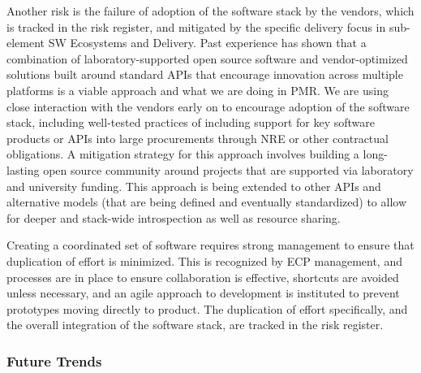Another risk is the failure of adoption of the software stack by the vendors, which is tracked in the risk register, and mitigated by the specific delivery focus in sub-element SW Ecosystems and Delivery. Past experience has shown that a combination of laboratory-supported open source software and vendor-optimized solutions built around standard APIs that encourage innovation across multiple platforms is a viable approach and what we are doing in PMR. We are using close interaction with the vendors early on to encourage adoption of the software stack, including well-tested practices of including support for key software products or APIs into large procurements through NRE or other contractual obligations. A mitigation strategy for this approach involves building a long-lasting open source community around projects that are supported via laboratory and university funding. This approach is being extended to other APIs and alternative models (that are being defined and eventually standardized) to allow for deeper and stack-wide introspection as well as resource sharing.

Creating a coordinated set of software requires strong management to ensure that duplication of effort is minimized. This is recognized by ECP management, and processes are in place to ensure collaboration is effective, shortcuts are avoided unless necessary, and an agile approach to development is instituted to prevent prototypes moving directly to product. The duplication of effort specifically, and the overall integration of the software stack, are tracked in the risk register. 

\subsubsection{Future Trends}
